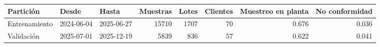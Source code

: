 \begin{tabular}{lllrrrrr}
\toprule
Partición & Desde & Hasta & Muestras & Lotes & Clientes & Muestreo en planta & No conformidad \\
\midrule
Entrenamiento & 2024-06-04 & 2025-06-27 & 15710 & 1707 & 70 & 0.676 & 0.036 \\
Validación & 2025-07-01 & 2025-12-19 & 5839 & 836 & 57 & 0.622 & 0.041 \\
\bottomrule
\end{tabular}
